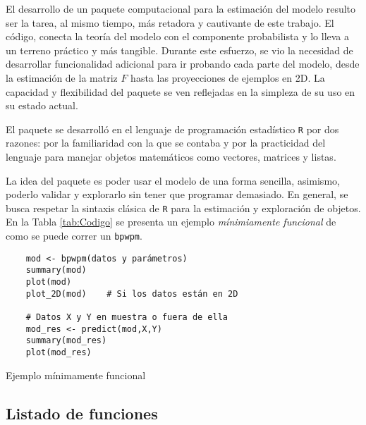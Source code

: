 \documentclass[../../Main/Main.tex]{subfiles}
\begin{document}
El desarrollo de un paquete computacional para la estimación del modelo resulto ser la tarea, al mismo tiempo, más retadora y cautivante de este trabajo. El código, conecta la teoría del modelo con el componente probabilista y lo lleva a un terreno práctico y más tangible. Durante este esfuerzo, se vio la necesidad de desarrollar funcionalidad adicional para ir probando cada parte del modelo, desde la estimación de la matriz $F$ hasta las proyecciones de ejemplos en 2D. La capacidad y flexibilidad del paquete se ven reflejadas en la simpleza de su uso en su estado actual. 

El paquete se desarrolló en el lenguaje de programación estadístico \verb|R| por dos razones: por la familiaridad con la que se contaba y por la practicidad del lenguaje para manejar objetos matemáticos como vectores, matrices y listas. 




La idea del paquete es poder usar el modelo de una forma sencilla, asimismo, poderlo validar y explorarlo sin tener que programar demasiado. En general, se busca respetar la sintaxis clásica de \verb|R| para la estimación y exploración de objetos. En la Tabla \ref{tab:Codigo} se presenta un ejemplo \textit{mínimiamente funcional} de como se puede correr un \verb|bpwpm|.

\begin{table}[h]
\makebox[\linewidth]{\rule{\textwidth}{0.4pt}}
\begin{verbatim}
	mod <- bpwpm(datos y parámetros)
	summary(mod)
	plot(mod) 
	plot_2D(mod)	# Si los datos están en 2D 

	# Datos X y Y en muestra o fuera de ella	
	mod_res <- predict(mod,X,Y)
	summary(mod_res)
	plot(mod_res)
\end{verbatim}
\makebox[\linewidth]{\rule{\textwidth}{0.4pt}}
\caption{Ejemplo mínimamente funcional}
\label{tab:Codigo}
\end{table}


\subsection{Listado de funciones}
\end{document}
